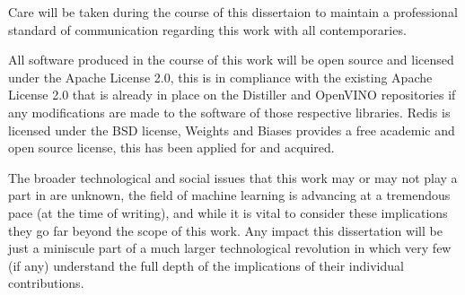 \documentclass[../../D1.tex]{subfiles}
\begin{document}
Care will be taken during the course of this dissertaion to maintain a professional standard of communication regarding this work with all contemporaries. 


All software produced in the course of this work will be open source and licensed under the Apache License 2.0, this is in  compliance with the existing Apache License 2.0 that is already in place on the Distiller and OpenVINO repositories if any modifications are made to the software of those respective libraries.
Redis is licensed under the BSD license, Weights and Biases provides a free academic and open source license, this has been applied for and acquired.


The broader technological and social issues that this work may or may not play a part in are unknown, the field of machine learning is advancing at a tremendous pace (at the time of writing), and while it is vital to consider these implications they go far beyond the scope of this work. 
Any impact this dissertation will be just a miniscule part of a much larger technological revolution in which very few (if any) understand the full depth of the implications of their individual contributions.
\end{document}
